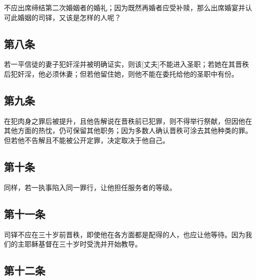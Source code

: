不应出席缔结第二次婚姻者的婚礼；因为既然再婚者应受补赎，那么出席婚宴并认可此婚姻的司铎，又该是怎样的人呢？\par


\subsection{第八条}

若一平信徒的妻子犯奸淫并被明确证实，则该[丈夫]不能进入圣职；若她在其晋秩后犯奸淫，他必须休妻；但若他留住她，则他不能在委托给他的圣职中有份。\par


\subsection{第九条}

在犯肉身之罪后被提升，且他告解说在晋秩前已犯罪，则不得举行祭献，但因他在其他方面的热忱，仍可保留其他职务；因为多数人确认晋秩可涂去其他种类的罪。但若他不告解且不能被公开定罪，决定取决于他自己。\par


\subsection{第十条}

同样，若一执事陷入同一罪行，让他担任服务者的等级。\par


\subsection{第十一条}

司铎不应在三十岁前晋秩，即使他在各方面都是配得的人，也应让他等待。因为我们的主耶稣基督在三十岁时受洗并开始教导。\par


\subsection{第十二条}

